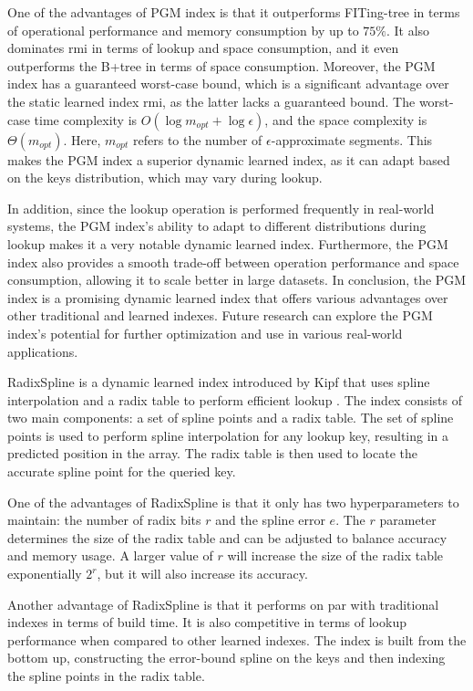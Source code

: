 One of the advantages of PGM index is that it outperforms FITing-tree in terms of operational performance and memory consumption by up to $75\%$. It also dominates \acrshort{rmi} in terms of lookup and space consumption, and it even outperforms the B+tree in terms of space consumption. Moreover, the PGM index has a guaranteed worst-case bound, which is a significant advantage over the static learned index \acrshort{rmi}, as the latter lacks a guaranteed bound. The worst-case time complexity is $O(\log m_{opt} + \log \epsilon)$, and the space complexity is $\Theta(m_{opt})$. Here, $m_{opt}$ refers to the number of $\epsilon$-approximate segments. This makes the PGM index a superior dynamic learned index, as it can adapt based on the keys distribution, which may vary during lookup.

In addition, since the lookup operation is performed frequently in real-world systems, the PGM index's ability to adapt to different distributions during lookup makes it a very notable dynamic learned index. Furthermore, the PGM index also provides a smooth trade-off between operation performance and space consumption, allowing it to scale better in large datasets. In conclusion, the PGM index is a promising dynamic learned index that offers various advantages over other traditional and learned indexes. Future research can explore the PGM index's potential for further optimization and use in various real-world applications. 

RadixSpline is a dynamic learned index introduced by Kipf that uses spline interpolation and a radix table to perform efficient lookup \cite{kipf2020radixspline}. The index consists of two main components: a set of spline points and a radix table. The set of spline points is used to perform spline interpolation for any lookup key, resulting in a predicted position in the array. The radix table is then used to locate the accurate spline point for the queried key.

One of the advantages of RadixSpline is that it only has two hyperparameters to maintain: the number of radix bits $r$ and the spline error $e$. The $r$ parameter determines the size of the radix table and can be adjusted to balance accuracy and memory usage. A larger value of $r$ will increase the size of the radix table exponentially $2^r$, but it will also increase its accuracy.

Another advantage of RadixSpline is that it performs on par with traditional indexes in terms of build time. It is also competitive in terms of lookup performance when compared to other learned indexes. The index is built from the bottom up, constructing the error-bound spline on the keys and then indexing the spline points in the radix table.

